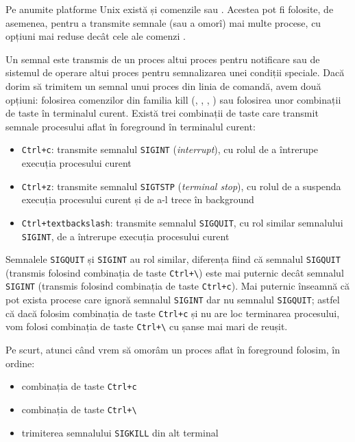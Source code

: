 Pe anumite platforme Unix există și comenzile  sau . Acestea pot fi
folosite, de asemenea, pentru a transmite semnale (sau a omorî) mai multe
procese, cu opțiuni mai reduse decât cele ale comenzi .

Un semnal este transmis de un proces altui proces pentru notificare sau de
sistemul de operare altui proces pentru semnalizarea unei condiții speciale.
Dacă dorim să trimitem un semnal unui proces din linia de comandă, avem două
opțiuni: folosirea comenzilor din familia kill (, , , ) sau
folosirea unor combinații de taste în terminalul curent. Există trei combinații
de taste care transmit semnale procesului aflat în foreground în terminalul
curent:

\begin{itemize}
  \item \texttt{Ctrl+c}: transmite semnalul \texttt{SIGINT} (\textit{interrupt}), cu rolul de a
		întrerupe execuția procesului curent
  \item \texttt{Ctrl+z}: transmite semnalul \texttt{SIGTSTP} (\textit{terminal stop}), cu rolul de a suspenda execuția
		procesului curent și de a-l trece în background
  \item \texttt{Ctrl+textbackslash{}}: transmite semnalul \texttt{SIGQUIT}, cu rol similar
                semnalului \texttt{SIGINT}, de a întrerupe execuția procesului curent
\end{itemize}

Semnalele \texttt{SIGQUIT} și \texttt{SIGINT} au rol similar, diferența fiind că semnalul \texttt{SIGQUIT}
(transmis folosind combinația de taste \texttt{Ctrl+\textbackslash{}}) este mai puternic
decât semnalul \texttt{SIGINT} (transmis folosind combinația de taste \texttt{Ctrl+c}). Mai
puternic înseamnă că pot exista procese care ignoră semnalul \texttt{SIGINT} dar nu
semnalul \texttt{SIGQUIT}; astfel că dacă folosim combinația de taste \texttt{Ctrl+c} și nu are
loc terminarea procesului, vom folosi combinația de taste \texttt{Ctrl+\textbackslash{}}
cu șanse mai mari de reușit.

Pe scurt, atunci când vrem să omorâm un proces aflat în foreground folosim, în
ordine:

\begin{itemize}
  \item combinația de taste \texttt{Ctrl+c}
  \item combinația de taste \texttt{Ctrl+\textbackslash{}}
  \item trimiterea semnalului \texttt{SIGKILL} din alt terminal
\end{itemize}

